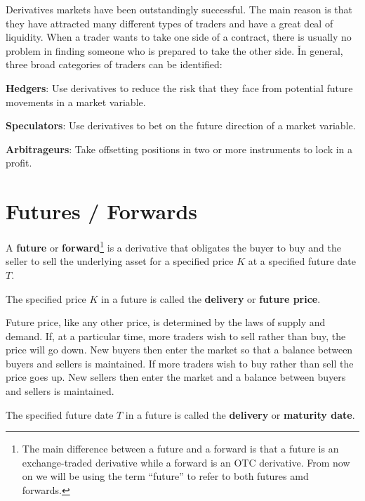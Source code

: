 Derivatives markets have been outstandingly successful. The main reason is that they have attracted many different
types of traders and have a great deal of liquidity. When a trader wants to take one side of a contract, there is
usually no problem in finding someone who is prepared to take the other side. \v

In general, three broad categories of traders can be identified:
\bit
\item \textbf{Hedgers}: Use derivatives to reduce the risk that they face from potential future movements in a market
variable.
\item \textbf{Speculators}: Use derivatives to bet on the future direction of a market variable.
\item \textbf{Arbitrageurs}: Take offsetting positions in two or more instruments to lock in a profit.
\eit

\section{Futures / Forwards}

A \textbf{future} or \textbf{forward}\footnote{The main difference between a future and a forward is that a future is an
exchange-traded derivative while a forward is an OTC derivative. From now on we will be using the term ``future'' to
refer to both futures amd forwards.} is a derivative that obligates the buyer to buy and the seller to sell the
underlying asset for a specified price $K$ at a specified future date $T$.
\ed

The specified price $K$ in a future is called the \textbf{delivery} or \textbf{future price}.
\ed

Future price, like any other price, is determined by the laws of supply and demand. If, at a particular time, more
traders wish to sell rather than buy, the price will go down. New buyers then enter the market so that a balance
between buyers and sellers is maintained. If more traders wish to buy rather than sell the price goes up. New
sellers then enter the market and a balance between buyers and sellers is maintained.

The specified future date $T$ in a future is called the \textbf{delivery} or \textbf{maturity date}.
\ed

